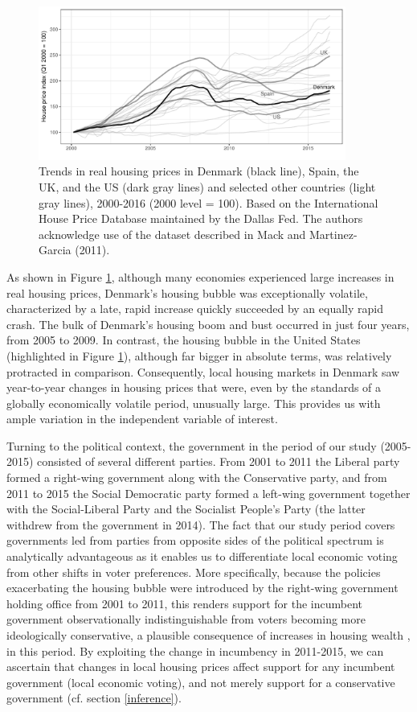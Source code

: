 \documentclass[12pt,a4paper]{article}
\begin{document}
	\begin{figure}[htbp!]
		\includegraphics[width=0.9\textwidth]{../figures/timeplot}
		\centering
		\caption{Trends in real housing prices in Denmark (black line), Spain, the UK, and the US (dark gray lines) and selected other countries (light gray lines), 2000-2016 (2000 level = 100). Based on the International House Price Database maintained by the Dallas Fed. The authors acknowledge use of the dataset described in Mack and Martinez-Garcia (2011).}\label{hpd}
	\end{figure}

	As shown in Figure \ref{hpd}, although many economies experienced large increases in real housing prices, Denmark's housing bubble was exceptionally volatile, characterized by a late, rapid increase quickly succeeded by an equally rapid crash. The bulk of Denmark's housing boom and bust occurred in just four years, from 2005 to 2009. In contrast, the housing bubble in the United States (highlighted in Figure \ref{hpd}), although far bigger in absolute terms, was relatively protracted in comparison. Consequently, local housing markets in Denmark saw year-to-year changes in housing prices that were, even by the standards of a globally economically volatile period, unusually large. This provides us with ample variation in the independent variable of interest.
	
	Turning to the political context, the government in the period of our study (2005-2015) consisted of several different parties. From 2001 to 2011 the Liberal party formed a right-wing government along with the Conservative party, and from 2011 to 2015 the Social Democratic party formed a left-wing government together with the Social-Liberal Party and the Socialist People’s Party (the latter withdrew from the government in 2014). The fact that our study period covers governments led from parties from opposite sides of the political spectrum is analytically advantageous as it enables us to differentiate local economic voting from other shifts in voter preferences. More specifically, because the policies exacerbating the housing bubble were introduced by the right-wing government holding office from 2001 to 2011, this renders support for the incumbent government observationally indistinguishable from voters becoming more ideologically conservative, a plausible consequence of increases in housing wealth \citep{ansell2014political}, in this period. By exploiting the change in incumbency in 2011-2015, we can ascertain that changes in local housing prices affect support for any incumbent government (local economic voting), and not merely support for a conservative government (cf. section \ref{inference}). 
	
\end{document}
